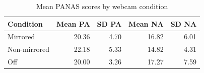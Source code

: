 \begin{table}[!h]
\centering
\caption{\label{tab:tab:desc}Mean PANAS scores by webcam condition}
\centering
\begin{tabular}[t]{lrrrr}
\toprule
Condition & Mean PA & SD PA & Mean NA & SD NA\\
\midrule
Mirrored & 20.36 & 4.70 & 16.82 & 6.01\\
Non-mirrored & 22.18 & 5.33 & 14.82 & 4.31\\
Off & 20.00 & 3.26 & 17.27 & 7.59\\
\bottomrule
\end{tabular}
\end{table}
